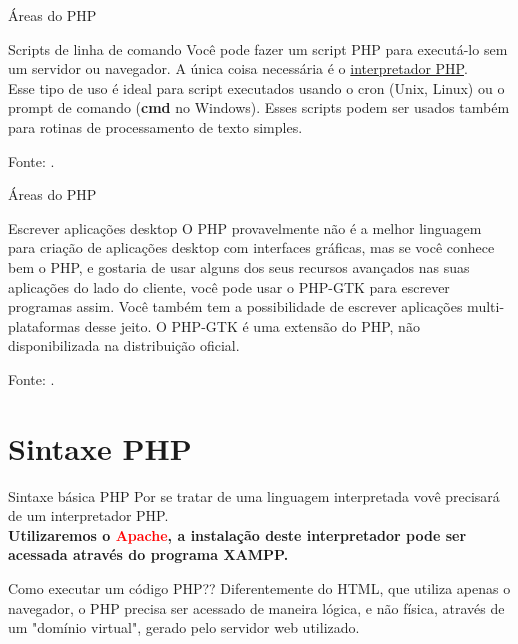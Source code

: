 \documentclass{beamer}
\begin{document}
\begin{frame}{Áreas do PHP}
\begin{block}{Scripts de linha de comando}
Você pode fazer um script PHP para executá-lo sem um servidor ou navegador. A única coisa necessária é o \underline{interpretador PHP}. \\
Esse tipo de uso é ideal para script executados usando o cron (Unix, Linux) ou o prompt de comando (\textbf{cmd} no Windows). Esses scripts podem ser usados também para rotinas de processamento de texto simples. 
\end{block}
\tiny Fonte: \cite{achout2022php}.
    
\end{frame}
\begin{frame}{Áreas do PHP}
\begin{block}{Escrever aplicações desktop}
O PHP provavelmente não é a melhor linguagem para criação de aplicações desktop com interfaces gráficas, mas se você conhece bem o PHP, e gostaria de usar alguns dos seus recursos avançados nas suas aplicações do lado do cliente, você pode usar o PHP-GTK para escrever programas assim. Você também tem a possibilidade de escrever aplicações multi-plataformas desse jeito. O PHP-GTK é uma extensão do PHP, não disponibilizada na distribuição oficial. 
\end{block}
\tiny Fonte: \cite{achout2022php}.
    
\end{frame}
\section{Sintaxe PHP}
\begin{frame}{Sintaxe básica PHP}
Por se tratar de uma linguagem interpretada vovê precisará de um interpretador PHP.\\
\textbf{Utilizaremos o \textcolor{red}{Apache}, a instalação deste interpretador pode ser acessada através do programa XAMPP.}\\
\begin{block}{Como executar um código PHP??}
Diferentemente do HTML, que utiliza apenas o navegador, o PHP precisa ser acessado de maneira lógica, e não física, através de um "domínio virtual", gerado pelo servidor web utilizado.\\
\vspace{0.5cm}

\end{block}
    
\end{frame}
\end{document}
